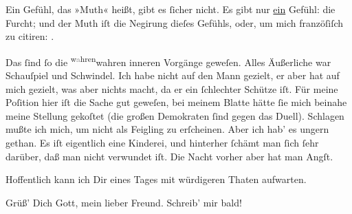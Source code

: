 \pstart
           Ein Gefühl, das »Muth« heißt, gibt es ſicher nicht. Es gibt nur \uline{ein} Gefühl: die Furcht; und der Muth iſt die Negirung dieſes {\pb}Gefühls, oder, um mich franzöſiſch zu citiren:
                  \label{K_L02791-5v}\label{K_L02791-5}.\pend
           
\pstart
           Das ſind ſo die \substVorne{}\textsuperscript{w\textcolor{gray}{a}hren}\substDazwischen{}wahren\substHinten{} inneren Vorgänge geweſen. Alles Äußerliche war Schauſpiel und Schwindel. Ich
               habe nicht auf den Mann
               gezielt, er aber hat auf mich gezielt, was aber nichts macht, da  er ein ſchlechter Schütze iſt. Für meine Poſition hier iſt die Sache gut
               geweſen, bei meinem Blatte
               hätte ſie mich beinahe meine Stellung gekoſtet (die großen Demokraten ſind gegen das
               Duell). Schlagen mußte ich mich, um nicht als {\pb}Feigling zu erſcheinen. Aber ich hab’ es ungern gethan. Es iſt eigentlich eine
               Kinderei, und hinterher ſchämt man ſich ſehr darüber, daß man nicht verwundet iſt.
               Die Nacht vorher aber hat man Angſt.\pend
           
\pstart
           Hoffentlich kann ich Dir eines Tages mit würdigeren Thaten aufwarten.\pend
           
\pstart
           Grüß’ Dich Gott, mein lieber Freund. Schreib’ mir bald!\pend
           
